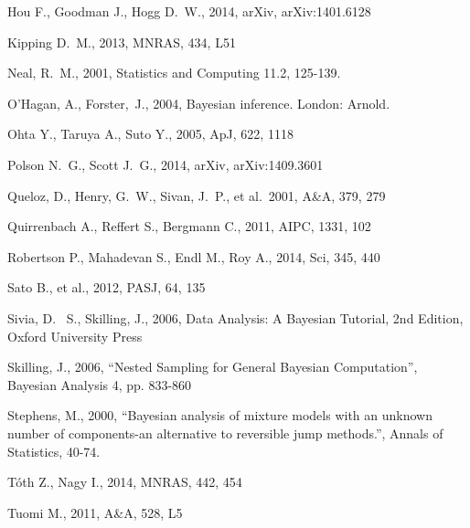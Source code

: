 \documentclass[useAMS,usenatbib]{mn2e}
\begin{document}
\begin{thebibliography}{99}
 Hou F., Goodman J., Hogg D.~W., 2014, arXiv, arXiv:1401.6128 

Kipping D.~M., 2013, MNRAS, 434, L51 

Neal, R.~M., 2001, Statistics and Computing 11.2, 125-139.

O'Hagan, A., Forster,~J., 2004, Bayesian inference. London: Arnold.

 Ohta Y., Taruya A., Suto Y., 2005, ApJ, 622, 1118

 Polson N.~G., Scott J.~G., 2014, arXiv, arXiv:1409.3601

 Queloz, D., Henry, G.~W., Sivan, J.~P., et al.\ 2001, A\&A, 379, 279 

 Quirrenbach A., Reffert S., Bergmann C., 2011, AIPC, 1331, 102 

 Robertson P., Mahadevan S., Endl M., Roy 
A., 2014, Sci, 345, 440 

Sato B., et al., 2012, PASJ, 64, 135 

 Sivia, 
D.~ S., Skilling, J., 2006, Data Analysis: A Bayesian Tutorial, 2nd 
Edition, Oxford University Press

 Skilling, 
J., 2006, ``Nested Sampling for General Bayesian Computation'', Bayesian 
Analysis 4, pp. 833-860

 Stephens, M., 2000, ``Bayesian analysis of mixture models with an unknown number of components-an alternative to reversible jump methods.'', Annals of Statistics, 40-74.

 T{\'o}th Z., Nagy I., 2014, MNRAS, 442, 454 

 Tuomi M., 2011, A\&A, 528, L5 


\end{thebibliography}
\end{document}
